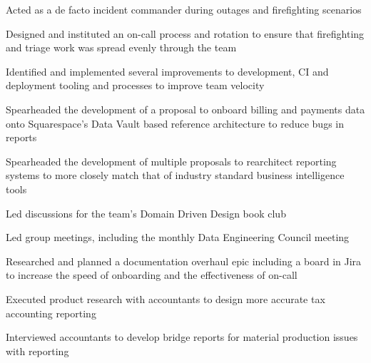\begin{job}

  \item Acted as a de facto incident commander during outages and firefighting scenarios
  \item Designed and instituted an on-call process and rotation to ensure that
    firefighting and triage work was spread evenly through the team
  \item Identified and implemented several improvements to development, CI and
    deployment tooling and processes to improve team velocity
  \item Spearheaded the development of a proposal to onboard billing and
    payments data onto Squarespace's Data Vault based reference architecture to
    reduce bugs in reports
  \item Spearheaded the development of multiple proposals to rearchitect
    reporting systems to more closely match that of industry standard business
    intelligence tools
  \item Led discussions for the team's Domain Driven Design book club
  \item Led group meetings, including the monthly Data Engineering Council
    meeting
  \item Researched and planned a documentation overhaul epic including a board
    in Jira to increase the speed of onboarding and the effectiveness of on-call
  \item Executed product research with accountants to design more accurate tax
    accounting reporting
  \item Interviewed accountants to develop bridge reports for material
    production issues with reporting
\end{job}
